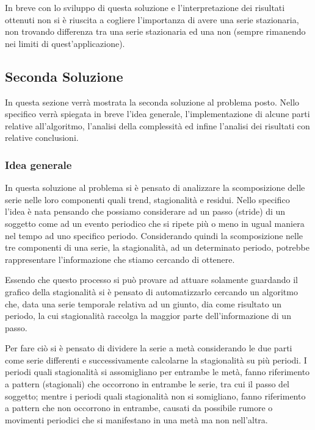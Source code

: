 In breve con lo sviluppo di questa soluzione e l'interpretazione dei risultati ottenuti
non si è riuscita a cogliere l'importanza di avere una serie stazionaria, non trovando
differenza tra una serie stazionaria ed una non (sempre rimanendo nei
limiti di quest'applicazione).







\subsection{Seconda Soluzione}
In questa sezione verrà mostrata la seconda soluzione al problema posto. Nello
specifico verrà spiegata in breve l’idea generale, l’implementazione di alcune parti relative all'algoritmo,
l’analisi della complessità ed infine
l'analisi dei risultati con relative conclusioni.

\subsubsection{Idea generale}
In questa soluzione al problema si è pensato di analizzare la scomposizione delle serie nelle 
loro componenti quali trend, stagionalità e residui. Nello specifico l'idea è nata
pensando che possiamo considerare ad un passo (stride) di un soggetto come ad un evento periodico
che si ripete più o meno in ugual maniera nel tempo ad uno specifico periodo. Considerando quindi
la scomposizione nelle tre componenti di una serie, la stagionalità, ad un determinato periodo, potrebbe
rappresentare l'informazione che stiamo cercando di ottenere.

Essendo che questo processo si può provare ad attuare solamente guardando il grafico della stagionalità
si è pensato di automatizzarlo cercando un algoritmo che, data una serie temporale relativa ad un giunto,
dia come risultato un periodo, la cui stagionalità raccolga la maggior parte dell'informazione di un passo. 

Per fare ciò si è pensato di dividere la serie a metà considerando le due parti come serie differenti
e successivamente calcolarne la stagionalità su più periodi. I periodi quali stagionalità si 
assomigliano per entrambe le metà, fanno riferimento a pattern (stagionali) che occorrono 
in entrambe le serie, tra cui il passo del soggetto; mentre i periodi quali stagionalità
non si somigliano, fanno riferimento a pattern che non occorrono in entrambe, causati da possibile
rumore o movimenti periodici che si manifestano in una metà ma non nell'altra.

